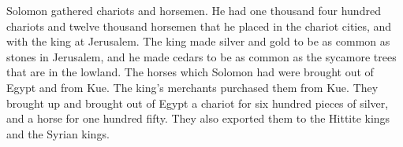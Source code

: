 {\par }{\PP {}Solomon gathered chariots and horsemen. He had one thousand four hundred chariots and twelve thousand horsemen that he placed in the chariot cities, and with the king at Jerusalem.
The king made silver and gold to be as common as stones in Jerusalem, and he made cedars to be as common as the sycamore trees that are in the lowland.
The horses which Solomon had were brought out of Egypt and from Kue. The king’s merchants purchased them from Kue.
They brought up and brought out of Egypt a chariot for six hundred pieces of silver, and a horse for one hundred fifty. They also exported them to the Hittite kings and the Syrian kings.

}
